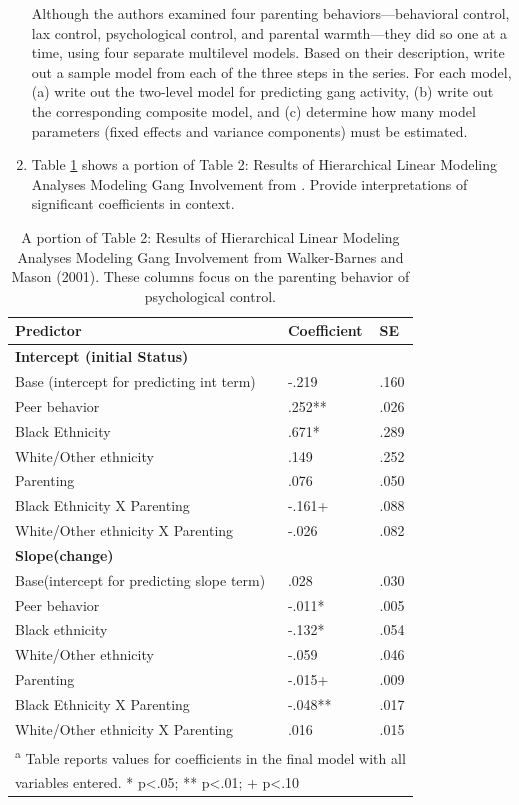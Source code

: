 \documentclass[
]{krantz}
\begin{document}
\begin{enumerate}
  Although the authors examined four parenting behaviors---behavioral control, lax control, psychological control, and parental warmth---they did so one at a time, using four separate multilevel models. Based on their description, write out a sample model from each of the three steps in the series. For each model, (a) write out the two-level model for predicting gang activity, (b) write out the corresponding composite model, and (c) determine how many model parameters (fixed effects and variance components) must be estimated.
\item
  Table \ref{tab:table4chp9} shows a portion of Table 2: Results of Hierarchical Linear Modeling Analyses Modeling Gang Involvement from \citet{Walker-Barnes2001}. Provide interpretations of significant coefficients in context.
\end{enumerate}

\begin{table}

\caption{\label{tab:table4chp9}A portion of Table 2: Results of Hierarchical Linear Modeling Analyses Modeling Gang Involvement from Walker-Barnes and Mason (2001).  These columns focus on the parenting behavior of psychological control.}
\centering
\begin{tabular}[t]{lll}
\toprule
Predictor & Coefficient & SE\\
\midrule
\textbf{Intercept (initial Status)} & \textbf{} & \textbf{}\\
Base (intercept for predicting int term) & -.219 & .160\\
Peer behavior & .252** & .026\\
Black Ethnicity & .671* & .289\\
White/Other ethnicity & .149 & .252\\
\addlinespace
Parenting & .076 & .050\\
Black Ethnicity X Parenting & -.161+ & .088\\
White/Other ethnicity X Parenting & -.026 & .082\\
\textbf{Slope(change)} & \textbf{} & \textbf{}\\
Base(intercept for predicting slope term) & .028 & .030\\
\addlinespace
Peer behavior & -.011* & .005\\
Black ethnicity & -.132* & .054\\
White/Other ethnicity & -.059 & .046\\
Parenting & -.015+ & .009\\
Black Ethnicity X Parenting & -.048** & .017\\
\addlinespace
White/Other ethnicity X Parenting & .016 & .015\\
\bottomrule
\multicolumn{3}{l}{\textsuperscript{a} Table reports values for coefficients in the final model with all}\\
\multicolumn{3}{l}{variables entered.  * p<.05; ** p<.01; + p<.10}\\
\end{tabular}
\end{table}
\end{document}
